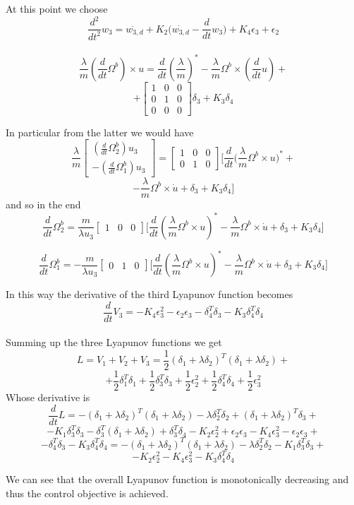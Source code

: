 At this point we choose
\[\frac{d^2}{dt^2}w_3= \ddot{w_{3,d}}+K_2\Bigg(\dot{w_{3,d}}-\frac{d}{dt}w_3\Bigg)+K_4\epsilon_3+\epsilon_2\]
\\
\[\frac{\lambda}{m}\left(\frac{d}{dt}\Omega^b\right) \times u=\frac{d}{dt}\left(\frac{\lambda}{m}\right)^*-\frac{\lambda}{m}\Omega^b\times\left(\frac{d}{dt}u\right)+\]\[+\begin{bmatrix}
    1 & 0 & 0 \\ 0 & 1 & 0 \\ 0 & 0 & 0 
\end{bmatrix}\delta_3+K_3\delta_4\]

In particular from the latter we would have
\[\frac{\lambda}{m}\begin{bmatrix}
    \left(\frac{d}{dt}\Omega_2^b\right)u_3 \\ -\left(\frac{d}{dt}\Omega_1^b\right)u_3
\end{bmatrix}=\begin{bmatrix}
    1 & 0 & 0 \\ 0 & 1 & 0
\end{bmatrix}\Bigg[\frac{d}{dt}\Bigg(\frac{\lambda}{m}\Omega^b\times u\Bigg)^*+\]\[-\frac{\lambda}{m}\Omega^b\times \dot u +\delta_3+K_3\delta_4\Bigg]\]
and so in the end
\[\frac{d}{dt}\Omega_2^b=\frac{m}{\lambda u_3}\begin{bmatrix}
    1 & 0 & 0
\end{bmatrix}\Bigg[\frac{d}{dt}\left(\frac{\lambda}{m}\Omega^b\times u\right)^*-\frac{\lambda}{m}\Omega^b \times \dot u +\delta_3+K_3\delta_4\Bigg]\]

\[\frac{d}{dt}\Omega_1^b=-\frac{m}{\lambda u_3}\begin{bmatrix}
    0 & 1 & 0
\end{bmatrix}\Bigg[\frac{d}{dt}\left(\frac{\lambda}{m}\Omega^b\times u\right)^*-\frac{\lambda}{m}\Omega^b \times \dot u +\delta_3+K_3\delta_4\Bigg]\]

In this way the derivative of the third Lyapunov function becomes
\[\frac{d}{dt}V_3=-K_4\epsilon_3^2-\epsilon_2\epsilon_3-\delta_4^T\delta_3-K_3\delta_4^T\delta_4\]
\\
Summing up the three Lyapunov functions we get
\[L=V_1+V_2+V_3=\frac{1}{2}(\delta_1+\lambda\delta_2)^T(\delta_1+\lambda\delta_2)+\]\[+\frac{1}{2}\delta_1^T\delta_1+\frac{1}{2}\delta_3^T\delta_3+\frac{1}{2}\epsilon_2^2+\frac{1}{2}\delta_4^T\delta_4+\frac{1}{2}\epsilon_3^2\]
Whose derivative is 
\[\frac{d}{dt}L=-(\delta_1+\lambda\delta_2)^T(\delta_1+\lambda\delta_2)-\lambda\delta_2^T\delta_2+(\delta_1+\lambda\delta_2)^T\delta_3+\]\[-K_1\delta_3^T\delta_3-\delta_3^T(\delta_1+\lambda\delta_2)+\delta_3^T\delta_4-K_2\epsilon_2^2+\epsilon_2\epsilon_3-K_4\epsilon_3^2-\epsilon_2\epsilon_3+\]\[-\delta_4^T\delta_3-K_3\delta_4^T\delta_4=
-(\delta_1+\lambda\delta_2)^T(\delta_1+\lambda\delta_2)-\lambda\delta_2^T\delta_2-K_1\delta_3^T\delta_3+\]\[-K_2\epsilon_2^2-K_4\epsilon_3^2-K_3\delta_4^T\delta_4\]

We can see that the overall Lyapunov function is monotonically decreasing and thus the control objective is achieved.